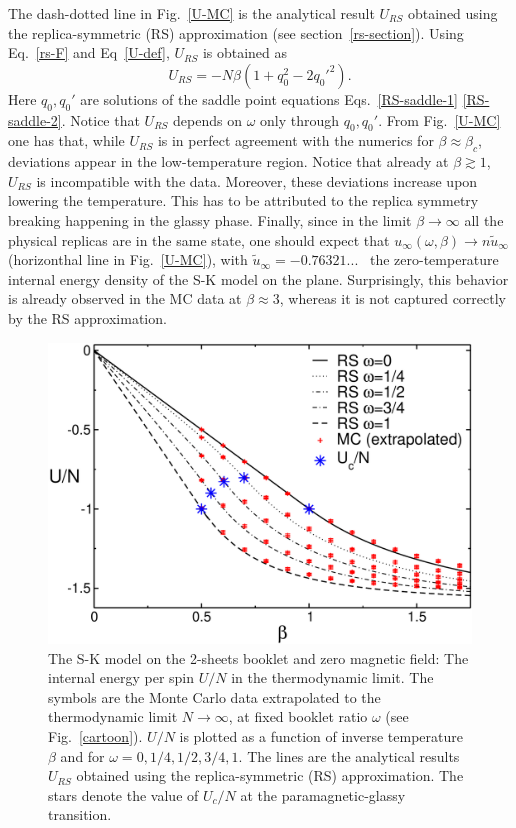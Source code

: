 \documentclass[twocolumn,superscriptaddress,prb,10pt]{revtex4-1}
\begin{document}
The dash-dotted line in Fig.~\ref{U-MC} is the analytical result $U_{RS}$ obtained using 
the replica-symmetric (RS) approximation (see section~\ref{rs-section}). 
Using Eq.~\eqref{rs-F} and Eq~\eqref{U-def}, $U_{RS}$  is obtained as   
%
\begin{equation}
U_{RS}=-N\beta(1+q_0^2-2q_0'^2). 
\label{U}
\end{equation}
% 
Here $q_0,q_0'$ are solutions of the saddle point equations Eqs.~\eqref{RS-saddle-1}
\eqref{RS-saddle-2}. Notice that $U_{RS}$ depends on $\omega$ only through $q_0,q_0'$. 
From Fig.~\ref{U-MC} one has that, while $U_{RS}$ is in perfect agreement with the 
numerics for $\beta\approx\beta_c$, deviations appear in the low-temperature region. 
Notice that already at $\beta\gtrsim 1$, $U_{RS}$ is incompatible with the data. 
Moreover, these deviations increase upon lowering the temperature. This has to be 
attributed to the replica symmetry breaking happening in the glassy phase. 
Finally, since in the limit $\beta\to\infty$ all the physical replicas are in the same state, 
one should expect that $u_\infty(\omega,\beta)\to n \tilde u_\infty$ (horizonthal line in 
Fig.~\ref{U-MC}), with $\tilde u_{\infty}=-0.76321...$~\cite{parisi-1979,parisi-1983} the 
zero-temperature internal energy density of the S-K model on the plane. Surprisingly, 
this behavior is already observed in the MC data at $\beta\approx 3$, whereas it is not 
captured correctly by the RS approximation.


\begin{figure}[t]
\includegraphics*[width=0.93\linewidth]{./draft_figs/U_extrapolated}
\caption{
 The S-K model on the 2-sheets booklet and zero magnetic field: 
 The internal energy per spin $U/N$ in the thermodynamic limit. 
 The symbols are the Monte Carlo data extrapolated to the thermodynamic 
 limit $N\to\infty$, at fixed booklet ratio $\omega$ (see Fig.~\ref{cartoon}).  
 $U/N$ is plotted as a function of inverse temperature $\beta$ and for 
 $\omega=0,1/4,1/2,3/4,1$. The lines are the analytical results $U_{RS}$ 
 obtained using the replica-symmetric (RS) approximation. The stars denote 
 the value of $U_c/N$ at the paramagnetic-glassy transition. 
}
\label{U-RS}
\end{figure}
\end{document}
